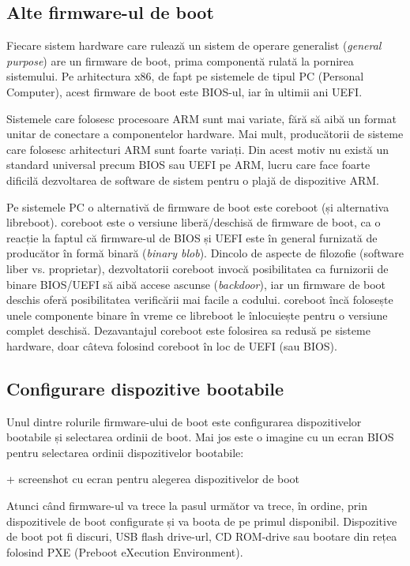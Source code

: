 \subsection{Alte firmware-ul de boot}
\label{sec:boot-firmware-uefi}

Fiecare sistem hardware care rulează un sistem de operare generalist (\textit{general
purpose}) are un firmware de boot, prima componentă rulată la pornirea
sistemului. Pe arhitectura x86, de fapt pe sistemele de tipul PC (Personal
Computer), acest firmware de boot este BIOS-ul, iar în ultimii ani UEFI.

Sistemele care folosesc procesoare ARM sunt mai variate, fără să aibă un format
unitar de conectare a componentelor hardware. Mai mult, producătorii de sisteme
care folosesc arhitecturi ARM sunt foarte variați. Din acest motiv nu există un
standard universal precum BIOS sau UEFI pe ARM, lucru care face foarte dificilă
dezvoltarea de software de sistem pentru o plajă de dispozitive ARM.

Pe sistemele PC o alternativă de firmware de boot este coreboot (și alternativa
libreboot). coreboot este o versiune liberă/deschisă de firmware de boot, ca o
reacție la faptul că firmware-ul de BIOS și UEFI este în general furnizată de producător în
formă binară (\textit{binary blob}). Dincolo de aspecte de filozofie (software liber vs.
proprietar), dezvoltatorii coreboot invocă posibilitatea ca furnizorii de binare
BIOS/UEFI să aibă accese ascunse (\textit{backdoor}), iar un firmware de boot deschis
oferă posibilitatea verificării mai facile a codului. coreboot încă folosește unele
componente binare în vreme ce libreboot le înlocuiește pentru o versiune complet
deschisă. Dezavantajul coreboot este folosirea sa redusă pe sisteme hardware,
doar câteva folosind coreboot în loc de UEFI (sau BIOS).

\subsection{Configurare dispozitive bootabile}
\label{sec:boot-firmware-devices}

Unul dintre rolurile firmware-ului de boot este configurarea dispozitivelor
bootabile și selectarea ordinii de boot. Mai jos este o imagine cu un ecran BIOS
pentru selectarea ordinii dispozitivelor bootabile:

+     screenshot cu ecran pentru alegerea dispozitivelor de boot

Atunci când firmware-ul va trece la pasul următor va trece, în ordine, prin
dispozitivele de boot configurate și va boota de pe primul disponibil.
Dispozitive de boot pot fi discuri, USB flash drive-url, CD ROM-drive sau
bootare din rețea folosind PXE 
(Preboot eXecution Environment).

